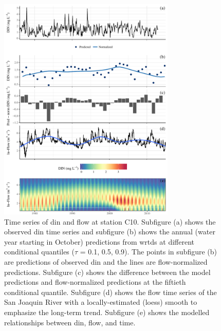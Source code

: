\documentclass[journal = esthag, manuscript = article]{achemso}\usepackage[]{graphicx}\usepackage[]{color}
\begin{document}
\begin{figure}[!ht]

{\centering \includegraphics[width=0.75\textwidth]{figs/dinc10-1} 

}

\caption{Time series of \ac{din} and flow at station C10.  Subfigure (a) shows the observed \ac{din} time series and subfigure (b) shows the annual (water year starting in October) predictions from \ac{wrtds} at different conditional quantiles ($\tau$ = 0.1, 0.5, 0.9).  The points in subfigure (b) are predictions of observed \ac{din} and the lines are flow-normalized predictions.  Subfigure (c) shows the difference between the model predictions and flow-normalized predictions at the fiftieth conditional quantile.  Subfigure (d) shows the flow time series of the San Joaquin River with a locally-estimated (loess) smooth to emphasize the long-term trend. Subfigure (e) shows the modelled relationships between \ac{din}, flow, and time.}\label{fig:dinc10}
\end{figure}
\end{document}
